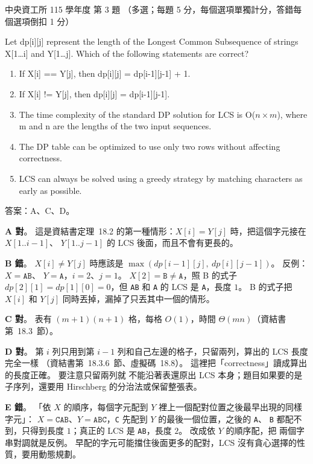 \begin{pastexam}[label={px:ncu-115-dsa-03}]{中央資工所 115 學年度 第 3 題}
（多選；每題 5 分，每個選項單獨計分，答錯每個選項倒扣 1 分）

Let dp[i][j] represent the length of the Longest Common Subsequence of strings X[1\ldots i] and Y[1\ldots j]. Which of the following statements are correct?
\begin{enumerate}[label=\Alph*.]
\item If X[i] == Y[j], then dp[i][j] = dp[i-1][j-1] + 1.
\item If X[i] != Y[j], then dp[i][j] = dp[i-1][j-1].
\item The time complexity of the standard DP solution for LCS is O($n\times m$), where m and n are the lengths of the two input sequences.
\item The DP table can be optimized to use only two rows without affecting correctness.
\item LCS can always be solved using a greedy strategy by matching characters as early as possible.
\end{enumerate}
\end{pastexam}

\begin{pastsoln}
答案：A、C、D。

\textbf{A 對}。 這是資結書定理~18.2 的第一種情形：$X[i] = Y[j]$ 時，把這個字元接在 $X[1..i-1]$、
$Y[1..j-1]$ 的 LCS 後面，而且不會有更長的。

\textbf{B 錯}。 $X[i] \ne Y[j]$ 時應該是 $\max(dp[i-1][j],\ dp[i][j-1])$。 反例：$X = \texttt{AB}$、
$Y = \texttt{A}$，$i = 2$、$j = 1$。 $X[2] = \texttt{B} \ne \texttt{A}$，照 B 的式子
$dp[2][1] = dp[1][0] = 0$，但 \texttt{AB} 和 \texttt{A} 的 LCS 是 \texttt{A}，長度 $1$。 B 的式子把
$X[i]$ 和 $Y[j]$ 同時丟掉，漏掉了只丟其中一個的情形。

\textbf{C 對}。 表有 $(m + 1)(n + 1)$ 格，每格 $O(1)$，時間 $\Theta(mn)$（資結書第~18.3~節）。

\textbf{D 對}。 第 $i$ 列只用到第 $i - 1$ 列和自己左邊的格子，只留兩列，算出的 LCS 長度完全一樣
（資結書第~18.3.6~節、虛擬碼~18.8）。 這裡把「correctness」讀成算出的長度正確。 要注意只留兩列就
不能沿著表還原出 LCS 本身；題目如果要的是子序列，還要用 Hirschberg 的分治法或保留整張表。

\textbf{E 錯}。 「依 $X$ 的順序，每個字元配到 $Y$ 裡上一個配對位置之後最早出現的同樣字元」：
$X = \texttt{CAB}$、$Y = \texttt{ABC}$，\texttt{C} 先配到 $Y$ 的最後一個位置，之後的 \texttt{A}、
\texttt{B} 都配不到，只得到長度 $1$；真正的 LCS 是 \texttt{AB}，長度 $2$。 改成依 $Y$ 的順序配，把
兩個字串對調就是反例。 早配的字元可能擋住後面更多的配對，LCS 沒有貪心選擇的性質，要用動態規劃。
\end{pastsoln}
